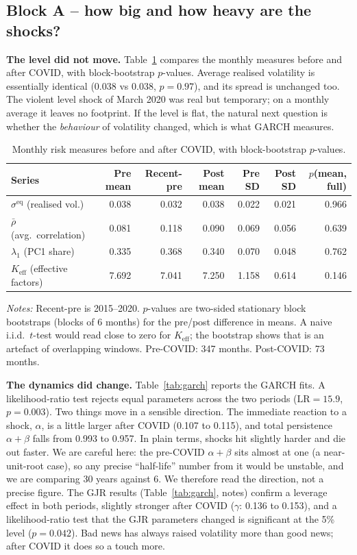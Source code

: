 \documentclass[11pt,a4paper]{article}
\newcommand{\rhobar}{\bar{\rho}}
\newcommand{\sigmaEq}{\sigma^{\text{eq}}}
\newcommand{\lambdaOne}{\lambda_1}
\newcommand{\Keff}{K_{\text{eff}}}
\begin{document}
\subsection{Block A -- how big and how heavy are the shocks?}

\textbf{The level did not move.} Table~\ref{tab:descriptive} compares the monthly measures before and
after COVID, with block-bootstrap $p$-values. Average realised volatility is essentially identical
(0.038 vs 0.038, $p=0.97$), and its spread is unchanged too. The violent level shock of March 2020 was
real but temporary; on a monthly average it leaves no footprint. If the level is flat, the natural next
question is whether the \emph{behaviour} of volatility changed, which is what GARCH measures.

\begin{table}[H]
\centering
\caption{Monthly risk measures before and after COVID, with block-bootstrap $p$-values.}
\label{tab:descriptive}
\small
\begin{tabular}{lrrrrrr}
\toprule
Series & Pre mean & Recent-pre & Post mean & Pre SD & Post SD & $p$(mean, full) \\
\midrule
$\sigmaEq$ (realised vol.)      & 0.038 & 0.032 & 0.038 & 0.022 & 0.021 & 0.966 \\
$\rhobar$ (avg.\ correlation)   & 0.081 & 0.118 & 0.090 & 0.069 & 0.056 & 0.639 \\
$\lambdaOne$ (PC1 share)        & 0.335 & 0.368 & 0.340 & 0.070 & 0.048 & 0.762 \\
$\Keff$ (effective factors)     & 7.692 & 7.041 & 7.250 & 1.158 & 0.614 & 0.146 \\
\bottomrule
\end{tabular}
\begin{flushleft}
\footnotesize
\textit{Notes:} Recent-pre is 2015--2020. $p$-values are two-sided stationary block bootstraps (blocks of
6 months) for the pre/post difference in means. A naive i.i.d.\ $t$-test would read close to zero for
$\Keff$; the bootstrap shows that is an artefact of overlapping windows. Pre-COVID: 347 months.
Post-COVID: 73 months.
\end{flushleft}
\end{table}

\textbf{The dynamics did change.} Table~\ref{tab:garch} reports the GARCH fits. A likelihood-ratio test
rejects equal parameters across the two periods ($\text{LR}=15.9$, $p=0.003$). Two things move in a
sensible direction. The immediate reaction to a shock, $\alpha$, is a little larger after COVID
(0.107 to 0.115), and total persistence $\alpha+\beta$ falls from 0.993 to 0.957. In plain terms, shocks
hit slightly harder and die out faster. We are careful here: the pre-COVID $\alpha+\beta$ sits almost at
one (a near-unit-root case), so any precise ``half-life'' number from it would be unstable, and we are
comparing 30 years against 6. We therefore read the direction, not a precise figure. The GJR results
(Table~\ref{tab:garch}, notes) confirm a leverage effect in both periods, slightly stronger after COVID
($\gamma$: 0.136 to 0.153), and a likelihood-ratio test that the GJR parameters changed is significant at
the 5\% level ($p=0.042$). Bad news has always raised volatility more than good news; after COVID it does
so a touch more.
\end{document}
